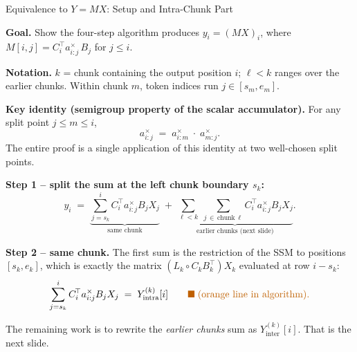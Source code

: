 \begin{frame}{Equivalence to $Y = MX$: Setup and Intra-Chunk Part}

  \textbf{Goal.} Show the four-step algorithm produces $y_i = (MX)_i$, where
  $M[i,j] = C_i^{\!\top} a^\times_{i:j}\, B_j$ for $j \le i$.

  \vspace{0.4em}
  \textbf{Notation.} $k$ = chunk containing the output position $i$; $\ell < k$ ranges over the earlier chunks. Within chunk $m$, token indices run $j \in [s_m, e_m]$.

  \vspace{0.4em}
  \textbf{Key identity (semigroup property of the scalar accumulator).}
  For any split point $j \le m \le i$,
  \[
    a^\times_{i:j} \;=\; a^\times_{i:m}\;\cdot\;a^\times_{m:j}.
  \]
  The entire proof is a single application of this identity at two well-chosen split points.

  \vspace{0.4em}
  \textbf{Step 1 -- split the sum at the left chunk boundary $s_k$:}
  \[
    y_i \;=\; \underbrace{\sum_{j = s_k}^{i} C_i^{\!\top} a^\times_{i:j} B_j X_j}_{\text{same chunk}}
            \;+\; \underbrace{\sum_{\ell < k}\;\sum_{j \,\in\, \text{chunk}\,\ell} C_i^{\!\top} a^\times_{i:j} B_j X_j}_{\text{earlier chunks (next slide)}}.
  \]

  \vspace{0.3em}
  \textbf{Step 2 -- same chunk.} The first sum is the restriction of the SSM to positions $[s_k, e_k]$, which is exactly the matrix $(L_k \circ C_k B_k^{\!\top}) X_k$ evaluated at row $i - s_k$:
  \[
    \sum_{j = s_k}^{i} C_i^{\!\top} a^\times_{i:j} B_j X_j
    \;=\; Y_{\text{intra}}^{(k)}[i]
    \qquad {\color{orange!75!black}\blacksquare\;\text{(orange line in algorithm).}}
  \]

  \vspace{0.3em}
  The remaining work is to rewrite the \emph{earlier chunks} sum as $Y_{\text{inter}}^{(k)}[i]$. That is the next slide.
\end{frame}

